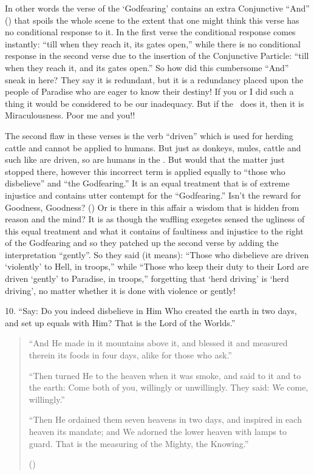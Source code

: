 \documentclass[12pt]{memoir}
\begin{document}
In other words the verse of the ‘God\–fearing’ contains
an extra Conjunctive “And” () that spoils the whole scene
to the extent that one might think this verse
has no conditional response to it.
In the first verse the conditional response comes instantly:
“till when they reach it, its gates open,”
while there is no conditional response in the second verse
due to the insertion of the Conjunctive Particle:
“till when they reach it, and its gates open.”
So how did this cumbersome “And” sneak in here?
They say it is redundant, but it is a redundancy placed upon the people
of Paradise who are eager to know their destiny!
If you or I did such a thing it would be considered to be our inadequacy.
But if the \Quran\ does it, then it is Miraculousness.
Poor me and you!!

The second flaw in these verses is the verb “driven” which is used
for herding cattle and cannot be applied to humans.\fnmarksym[*]\@
But just as donkeys, mules, cattle and such like are driven,
so are humans in the \Quran.
But would that the matter just stopped there,
however this incorrect term is applied equally to “those who disbelieve”
and “the God\–fearing.”
It is an equal treatment that is of extreme injustice
and contains utter contempt for the “God\–fearing.”
Isn’t the reward for Goodness, Goodness? ()
Or is there in this affair a wisdom that is hidden from reason and the mind?
It is as though the waffling exegetes sensed the ugliness
of this equal treatment and what it contains of faultiness
and injustice to the right of the God\–fearing and so they patched up
the second verse by adding the interpretation “gently”.
So they said (it means):
“Those who disbelieve are driven ‘violently’ to Hell, in troops,” while
“Those who keep their duty to their Lord
are driven ‘gently’ to Paradise, in troops,”
forgetting that ‘herd driving’ is ‘herd driving’,
no matter whether it is done with violence or gently!


10. “Say: Do you indeed disbelieve in Him Who created the earth in two days,
and set up equals with Him? That is the Lord of the Worlds.”

\begin{quote}
“And He made in it mountains above it, and blessed it and measured therein
its foods in four days, alike for those who ask.”

“Then turned He to the heaven when it was smoke,
and said to it and to the earth: Come both of you, willingly or unwillingly.
They said: We come, willingly.”

“Then He ordained them seven heavens in two days,
and inspired in each heaven its mandate;
and We adorned the lower heaven with lamps to guard.
That is the measuring of the Mighty, the Knowing.”

()
\end{quote}
\end{document}
